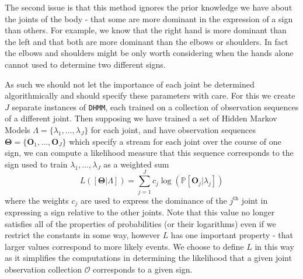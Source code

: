 The second issue is that this method ignores the prior knowledge we have about the joints of the body - that some are more dominant in the expression of a sign than others. For example, we know that the right hand is more dominant than the left and that both are more dominant than the elbows or shoulders. In fact the elbows and shoulders might be only worth considering when the hands alone cannot used to determine two different signs.

As such we should not let the importance of each joint be determined algorithmically and should specify these parameters with care. For this we create $J$ separate instances of \verb|DHMM|, each trained on a collection of observation sequences of a different joint. Then supposing we have trained a set of Hidden Markov Models $\Lambda = \{\lambda_1, \dots, \lambda_J\}$ for each joint, and have observation sequences $\mathbf{\Theta} = \{\mathbf{O}_1,\dots, \mathbf{O}_J\}$ which specify a stream for each joint over the course of one sign, we can compute a likelihood measure that this sequence corresponds to the sign used to train $\lambda_1, \dots, \lambda_J$ as a weighted sum
\begin{equation*}
L([\bm{\Theta} | \Lambda ]) = \sum_{j=1}^{J} c_j \log(\mathbb{P}[\mathbf{O}_j | \lambda_j])
\end{equation*}
where the weights $c_j$ are used to express the dominance of the $j^\text{th}$ joint in expressing a sign relative to the other joints. Note that this value no longer satisfies all of the properties of probabilities (or their logarithms) even if we restrict the constants in some way, however $L$ has one important property - that larger values correspond to more likely events. We choose to define $L$ in this way as it simplifies the computations in determining the likelihood that a given joint observation collection $\mathcal{O}$ corresponds to a given sign.

